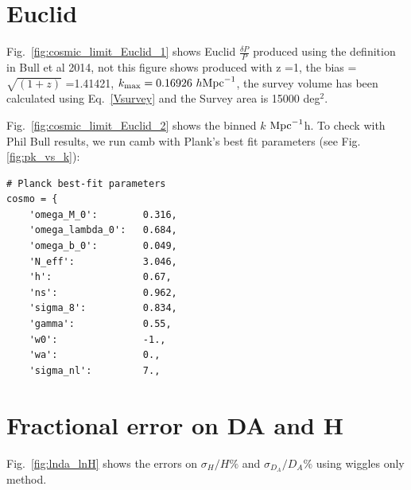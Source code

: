 \documentclass[10pt,a4paper]{article}
\begin{document}
\section{Euclid}

 Fig.~\ref{fig:cosmic_limit_Euclid_1} shows Euclid $\frac{\delta P}{P}$ produced using the definition in Bull et al 2014, not this figure shows produced with z =1, the bias = $ \sqrt{(1+z)}$ =1.41421, $k_{\rm max} = 0.16926\  h {\rm Mpc}^{-1}$, the survey volume has been calculated using Eq.~\ref{Vsurvey} and the Survey area is 15000 deg$^2$.



Fig.~\ref{fig:cosmic_limit_Euclid_2} shows the binned $k$ $\rm{Mpc}^{-1}$h. To check with Phil Bull results, we run camb with Plank's best fit parameters (see Fig.~ \ref{fig:pk_vs_k}):

\begin{verbatim}
# Planck best-fit parameters
cosmo = {
    'omega_M_0':        0.316,
    'omega_lambda_0':   0.684,
    'omega_b_0':        0.049,
    'N_eff':            3.046,
    'h':                0.67,
    'ns':               0.962,
    'sigma_8':          0.834,
    'gamma':            0.55,
    'w0':               -1.,
    'wa':               0.,
    'sigma_nl':         7.,
\end{verbatim}

\section{Fractional error on DA and H}
Fig.~\ref{fig:lnda_lnH} shows the errors on $\sigma_H/H \%$ and  $\sigma_{D_A}/D_A \%$ using wiggles only method.
\end{document}
